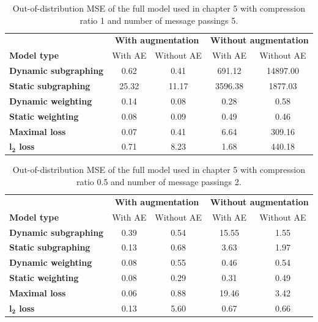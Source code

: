 \documentclass[12pt,a4paper]{report}
\begin{document}
\begin{appendices}
\begin{table}
\centering
\caption{Out-of-distribution MSE of the full model used in chapter 5 with compression ratio 1 and number of message passings 5.}
\label{table_1_5}
\begin{tabular}{lcccc}
\toprule
 & \multicolumn{2}{c}{\textbf{With augmentation}} & \multicolumn{2}{c}{\textbf{Without augmentation}} \\
 \cmidrule{2-3} \cmidrule{4-5}
\textbf{Model type} & With AE & Without AE & With AE & Without AE \\
\midrule
\textbf{Dynamic subgraphing} & 0.62 & 0.41 & 691.12 & 14897.00 \\
\textbf{Static subgraphing} & 25.32 & 11.17 & 3596.38 & 1877.03 \\
\textbf{Dynamic weighting} & 0.14 & 0.08 & 0.28 & 0.58 \\
\textbf{Static weighting} & 0.08 & 0.09 & 0.49 & 0.46 \\
\textbf{Maximal loss} & 0.07 & 0.41 & 6.64 & 309.16 \\
\textbf{$\boldsymbol{l_2}$ loss} & 0.71 & 8.23 & 1.68 & 440.18 \\
\bottomrule
\end{tabular}
\end{table}

\begin{table}
\centering
\caption{Out-of-distribution MSE of the full model used in chapter 5 with compression ratio 0.5 and number of message passings 2.}
\label{table_0.5_2}
\begin{tabular}{lcccc}
\toprule
 & \multicolumn{2}{c}{\textbf{With augmentation}} & \multicolumn{2}{c}{\textbf{Without augmentation}} \\
 \cmidrule{2-3} \cmidrule{4-5}
\textbf{Model type} & With AE & Without AE & With AE & Without AE \\
\midrule
\textbf{Dynamic subgraphing} & 0.39 & 0.54 & 15.55 & 1.55 \\
\textbf{Static subgraphing} & 0.13 & 0.68 & 3.63 & 1.97 \\
\textbf{Dynamic weighting} & 0.08 & 0.55 & 0.46 & 0.54 \\
\textbf{Static weighting} & 0.08 & 0.29 & 0.31 & 0.49 \\
\textbf{Maximal loss} & 0.06 & 0.88 & 19.46 & 3.42 \\
\textbf{$\boldsymbol{l_2}$ loss} & 0.13 & 5.60 & 0.67 & 0.66 \\
\bottomrule
\end{tabular}
\end{table}


\end{appendices}
\end{document}
